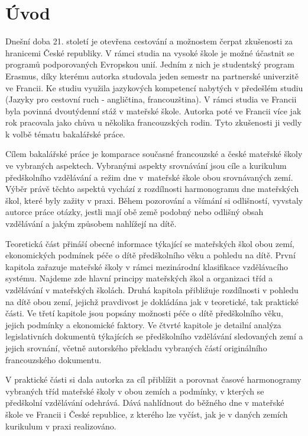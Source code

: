 \setcounter{page}{1}
\chapter*{Úvod}
Dnešní doba 21. století je otevřena cestování a možnostem čerpat zkušenosti za hranicemi České republiky. V rámci studia na vysoké škole je možné účastnit se programů podporovaných Evropskou unií. Jedním z nich je studentský program Erasmus, díky kterému autorka studovala jeden semestr na partnerské univerzitě ve Francii. Ke studiu využila jazykových kompetencí nabytých v předešlém studiu (Jazyky pro cestovní ruch - angličtina, francouzština). V rámci studia ve Francii byla povinná dvoutýdenní stáž v mateřské škole. Autorka poté ve Francii více jak rok pracovala jako chůva u několika francouzských rodin. Tyto zkušenosti ji vedly k volbě tématu bakalářské práce. 

Cílem bakalářské práce je komparace současné francouzské a české mateřské školy ve vybraných aspektech. Vybranými aspekty srovnávání jsou cíle a kurikulum předškolního vzdělávání a režim dne v mateřské škole obou srovnávaných zemí. Výběr právě těchto aspektů vychází z rozdílnosti harmonogramu dne mateřských škol, které byly zažity v praxi. Během pozorování a všímání si odlišností, vyvstaly autorce práce otázky, jestli mají obě země podobný nebo odlišný obsah vzdělávání a jakým způsobem nahlížejí na dítě. 

Teoretická část přináší obecné informace týkající se mateřských škol obou zemí, ekonomických podmínek péče o dítě předškolního věku a pohledu na dítě. První kapitola zařazuje mateřské školy v rámci mezinárodní klasifikace vzdělávacího systému. Najdeme zde hlavní principy mateřských škol a organizaci tříd a vzdělávání v mateřských školách. Druhá kapitola přibližuje rozdílnosti v pohledu na dítě obou zemí, jejichž pravdivost je dokládána jak v teoretické, tak praktické části. Ve třetí kapitole jsou popsány možnosti péče o dítě předškolního věku, jejich podmínky a ekonomické faktory. Ve čtvrté kapitole je detailní analýza legislativních dokumentů týkajících se předškolního vzdělávání sledovaných zemí a jejich srovnání, včetně autorského překladu vybraných částí originálního francouzského dokumentu.

V praktické části si dala autorka za cíl přiblížit a porovnat časové harmonogramy vybraných tříd mateřské školy v obou zemích a podmínky, v kterých se předškolní vzdělávání odehrává. Dává nahlídnout do běžného dne v mateřské škole ve Francii i České republice, z kterého lze vyčíst, jak je v daných zemích kurikulum v praxi realizováno.  